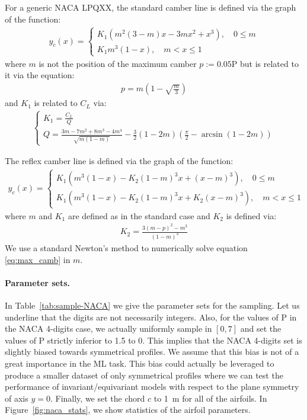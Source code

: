 \begin{subappendices}
	For a generic \acrshort{NACA} LPQXX, the standard camber line is defined via the graph of the function:
	\begin{align}
		y_c(x) = 
		\begin{cases}
			K_1\left(m^2(3-m)x - 3mx^2 + x^3\right), \quad 0\leqslant m \\
			K_1m^3(1-x), \quad m< x \leqslant 1
		\end{cases}
	\end{align}
	where $m$ is not the position of the maximum camber $p := 0.05$P but is related to it via the equation:
	\begin{align}\label{eq:max_camb}
		p = m\left(1-\sqrt{\frac{m}{3}}\right)
	\end{align}
	and $K_1$ is related to $C_L$ via:
	\begin{align}
		\begin{cases}
			K_1 = \frac{C_L}{Q} \\
			Q = \frac{3m - 7m^2 + 8m^3 - 4m^4}{\sqrt{m(1-m)}} - \frac{3}{2}(1-2m)\left(\frac{\pi}{2} - \arcsin(1-2m)\right)
		\end{cases}
	\end{align}
	
	The reflex camber line is defined via the graph of the function:
	\begin{align}
		y_c(x) = 
		\begin{cases}
			K_1\left(m^3(1-x) - K_2(1-m)^3x + (x-m)^3\right), \quad 0\leqslant m \\
			K_1\left(m^3(1-x) - K_2(1-m)^3x + K_2(x-m)^3\right), \quad m< x \leqslant 1
		\end{cases}
	\end{align}
	where $m$ and $K_1$ are defined as in the standard case and $K_2$ is defined via:
	\begin{align}
		K_2 = \frac{3(m - p)^2 - m^3}{(1-m)^3}
	\end{align}
	We use a standard Newton's method to numerically solve equation \ref{eq:max_camb} in $m$.
	
	\paragraph{Parameter sets.}\label{sec:naca_sample} In Table~\ref{tab:sample-NACA} we give the parameter sets for the sampling. Let us underline that the digits are not necessarily integers. Also, for the values of P in the \acrshort{NACA} 4-digits case, we actually uniformly sample in $[0, 7]$ and set the values of P strictly inferior to 1.5 to 0. This implies that the \acrshort{NACA} 4-digits set is slightly biased towards symmetrical profiles. We assume that this bias is not of a great importance in the \acrshort{ML} task. This bias could actually be leveraged to produce a smaller dataset of only symmetrical profiles where we can test the performance of invariant/equivariant models with respect to the plane symmetry of axis $y = 0$. Finally, we set the chord $c$ to \SI{1}{\meter} for all of the airfoils. In Figure~\ref{fig:naca_stats}, we show statistics of the airfoil parameters. 
	

\end{subappendices}
